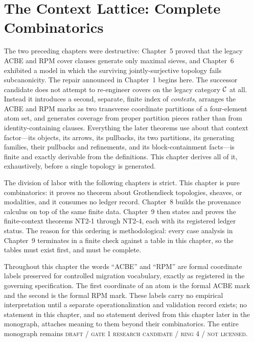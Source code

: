 \chapter{The Context Lattice: Complete Combinatorics}\label{ch07:main}

The two preceding chapters were destructive: Chapter~5 proved that the legacy ACBE and RPM cover clauses generate only maximal sieves, and Chapter~6 exhibited a model in which the surviving jointly-surjective topology fails subcanonicity. The repair announced in Chapter~1 begins here. The successor candidate does not attempt to re-engineer covers on the legacy category $\mathcal{C}$ at all. Instead it introduces a second, separate, finite index of \emph{contexts}, arranges the ACBE and RPM marks as two transverse coordinate partitions of a four-element atom set, and generates coverage from proper partition pieces rather than from identity-containing clauses. Everything the later theorems use about that context factor---its objects, its arrows, its pullbacks, its two partitions, its generating families, their pullbacks and refinements, and its block-containment facts---is finite and exactly derivable from the definitions. This chapter derives all of it, exhaustively, before a single topology is generated.

The division of labor with the following chapters is strict. This chapter is pure combinatorics: it proves no theorem about Grothendieck topologies, sheaves, or modalities, and it consumes no ledger record. Chapter~8 builds the provenance calculus on top of the same finite data. Chapter~9 then states and proves the finite-context theorems NT2-1 through NT2-4, each with its registered ledger status. The reason for this ordering is methodological: every case analysis in Chapter~9 terminates in a finite check against a table in this chapter, so the tables must exist first, and must be complete.

\begin{boundary}\label{ch07:boundary-marks}
Throughout this chapter the words ``ACBE'' and ``RPM'' are formal coordinate labels preserved for controlled migration vocabulary, exactly as registered in the governing specification. The first coordinate of an atom is the formal ACBE mark and the second is the formal RPM mark. These labels carry no empirical interpretation until a separate operationalization and validation record exists; no statement in this chapter, and no statement derived from this chapter later in the monograph, attaches meaning to them beyond their combinatorics. The entire monograph remains \textsc{draft / gate 1 research candidate / ring 4 / not licensed}.
\end{boundary}

